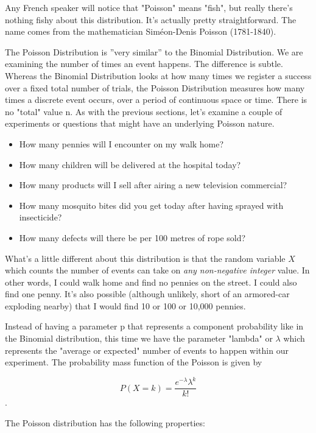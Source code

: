 Any French speaker will notice that "Poisson" means "fish", but really there's nothing fishy about this distribution. It's actually pretty straightforward. The name comes from the mathematician Siméon-Denis Poisson (1781-1840).

The Poisson Distribution is ''very similar'' to the Binomial Distribution. We are examining the number of times an event happens. The difference is subtle. Whereas the Binomial Distribution looks at how many times we register a success over a fixed total number of trials, the Poisson Distribution measures how many times a discrete event occurs, over a period of continuous space or time. There is no "total" value n. As with the previous sections, let's examine a couple of experiments or questions that might have an underlying Poisson nature.

\begin{itemize}
  \item How many pennies will I encounter on my walk home?
  \item How many children will be delivered at the hospital today?
  \item How many products will I sell after airing a new television commercial?
  \item How many mosquito bites did you get today after having sprayed with insecticide?
  \item How many defects will there be per 100 metres of rope sold?
\end{itemize}

What's a little different about this distribution is that the random variable $X$ which counts the number of events can take on \emph{any non-negative integer} value. In other words, I could walk home and find no pennies on the street. I could also find one penny. It's also possible (although unlikely, short of an armored-car exploding nearby) that I would find 10 or 100 or 10,000 pennies.

Instead of having a parameter p that represents a component probability like in the Binomial distribution, this time we have the parameter "lambda" or $\lambda$ which represents the "average or expected" number of events to happen within our experiment. The probability mass function of the Poisson is given by

\begin{equation}
  P(X=k)=\frac{e^{-\lambda}\lambda^k}{k!}
\end{equation}.

The Poisson distribution has the following properties:


